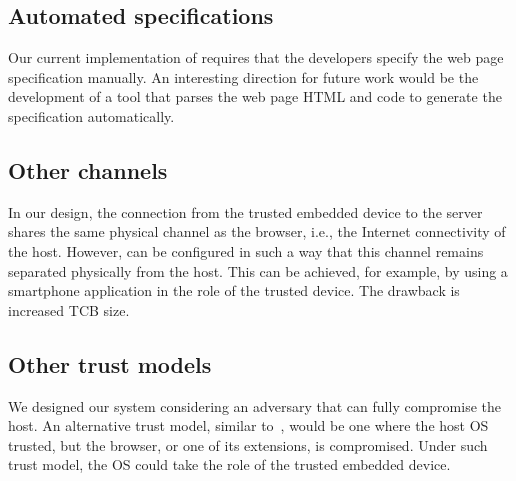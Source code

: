 \subsection{Automated specifications} Our current implementation of \tool requires that the developers specify the web page specification manually. An interesting direction for future work would be the development of a tool that parses the web page HTML and \js code to generate the specification automatically. 

\subsection{Other channels} In our design, the connection from the trusted embedded device to the server shares the same physical channel as the browser, i.e., the Internet connectivity of the host. However, \tool can be configured in such a way that this channel remains separated physically from the host. This can be achieved, for example, by using a smartphone application in the role of the trusted device. The drawback is increased TCB size.

\subsection{Other trust models} We designed our system considering an adversary that can fully compromise the host. An alternative trust model, similar to~\cite{gyrus,nab}, would be one where the host OS trusted, but the browser, or one of its extensions, is compromised. Under such trust model, the OS could take the role of the trusted embedded device. 




